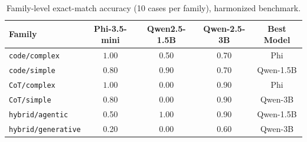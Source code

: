 \documentclass{article}
\begin{document}
\begin{table}[htbp]
\centering
\caption{Family-level exact-match accuracy (10 cases per family), harmonized benchmark.}
\label{tab:pilot-family}
\begin{tabular}{lcccc}
\toprule
Family & Phi-3.5-mini & Qwen2.5-1.5B & Qwen-2.5-3B & Best Model \\
\midrule
\texttt{code/complex} & $\mathbf{1.00}$ & 0.50 & 0.70 & Phi \\
\texttt{code/simple} & 0.80 & $\mathbf{0.90}$ & 0.70 & Qwen-1.5B \\
\texttt{CoT/complex} & $\mathbf{1.00}$ & 0.00 & 0.90 & Phi \\
\texttt{CoT/simple} & 0.80 & 0.00 & $\mathbf{0.90}$ & Qwen-3B \\
\texttt{hybrid/agentic} & 0.50 & $\mathbf{1.00}$ & 0.90 & Qwen-1.5B \\
\texttt{hybrid/generative} & 0.20 & 0.00 & $\mathbf{0.60}$ & Qwen-3B \\
\bottomrule
\end{tabular}
\end{table}
\end{document}

